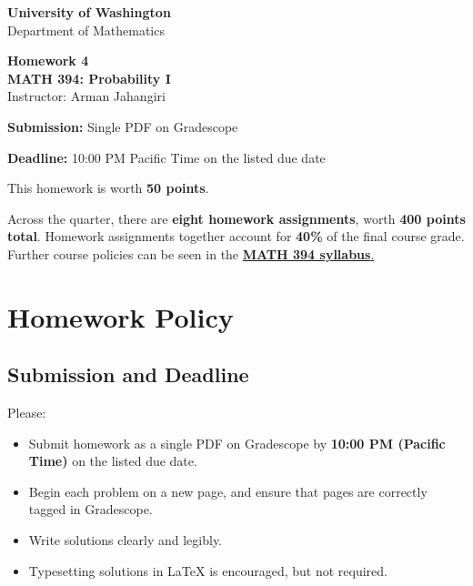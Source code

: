 \documentclass[11pt]{article}
\newcommand{\course}{MATH 394: Probability I}
\newcommand{\department}{Department of Mathematics}
\newcommand{\university}{University of Washington}
\begin{document}
\begin{titlepage}
\centering
\vspace*{1.2cm}

{\Large \textbf{\university}}\\
{\large \department}

\vspace{1.5cm}

{\Huge \color{uwpurple}\textbf{Homework 4}}\\[0.25cm]
{\Large \textbf{\course}}\\[0.25cm]
{\large Instructor: Arman Jahangiri}

\vspace{1cm}

\begin{tcolorbox}[
    width=0.78\textwidth,
    colback=softpurple,
    colframe=uwpurple,
    boxrule=0.9pt,
    arc=3mm
]
\centering
\textbf{Submission:} Single PDF on Gradescope

\textbf{Deadline:} 10:00 PM Pacific Time on the listed due date
\end{tcolorbox}

\vspace{0.8cm}

\begin{tcolorbox}[
    width=0.86\textwidth,
    colback=white,
    colframe=uwgold,
    boxrule=0.8pt,
    arc=3mm
]
This homework is worth \textbf{50 points}.

Across the quarter, there are \textbf{eight homework assignments}, worth \textbf{400 points total}. Homework assignments together account for \textbf{40\%} of the final course grade. Further course policies can be seen in the \href{https://armanjg.github.io/MATH-394-Probability-1-v2/}{\textbf{MATH 394 syllabus}.}
\end{tcolorbox}

\vfill
\end{titlepage}

\section*{Homework Policy}

\subsection*{Submission and Deadline}

Please:

\begin{itemize}[leftmargin=*]
    \item Submit homework as a single PDF on Gradescope by \textbf{10:00 PM (Pacific Time)} on the listed due date.
    \item Begin each problem on a new page, and ensure that pages are correctly tagged in Gradescope.
    \item Write solutions clearly and legibly.
    \item Typesetting solutions in LaTeX is encouraged, but not required.
\end{itemize}
\end{document}
